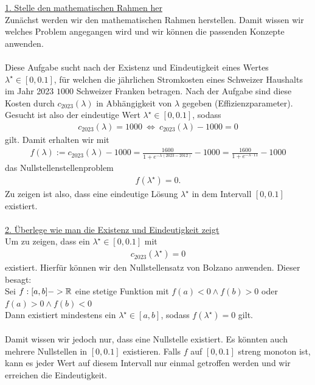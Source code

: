 \underline{1. Stelle den mathematischen Rahmen her}\\
Zunächst werden wir den mathematischen Rahmen herstellen. Damit wissen wir welches Problem angegangen wird und wir können die passenden Konzepte anwenden.\\
\\
Diese Aufgabe sucht nach der Existenz und Eindeutigkeit eines Wertes $\lambda^\star \in [0,0.1]$, für welchen die jährlichen Stromkosten eines Schweizer Haushalts im Jahr 2023 $1000$ Schweizer Franken betragen.
Nach der Aufgabe sind diese Kosten durch $c_{2023}(\lambda)$ in Abhängigkeit von $\lambda$ gegeben (Effizienzparameter).
Gesucht ist also der eindeutige Wert $\lambda^\star \in [0,0.1]$, sodass 
\begin{align*}
	c_{2023}(\lambda) = 1000
	\ \Leftrightarrow \ 
	c_{2023}(\lambda) - 1000 = 0
\end{align*}
gilt. Damit erhalten wir mit 
\begin{align*}
	f(\lambda) := c_{2023}(\lambda) - 1000 
	=
	\frac{1600}{1 + e^{- \lambda (2023 - 2012)}} - 1000
	=
	\frac{1600}{1 + e^{- \lambda\cdot 11}} - 1000
\end{align*}
das Nullstellenstellenproblem
\begin{align*}
	f(\lambda^\star) = 0.
\end{align*}
Zu zeigen ist also, dass eine eindeutige Lösung $\lambda^\star$ in dem Intervall $[0, 0.1]$ existiert.\\
\\
\underline{2. Überlege wie man die Existenz und Eindeutigkeit zeigt}\\
Um zu zeigen, dass ein $\lambda^\star  \in [0,0.1]$ mit
\begin{align*}
	c_{2023}(\lambda^\star) = 0
\end{align*}
existiert. Hierfür können wir den Nullstellensatz von Bolzano anwenden. Dieser besagt:\\
Sei $f:[a,b] -> \mathbb{R}$ eine stetige Funktion mit $f(a) < 0 \wedge f(b) > 0 $ oder $f(a) > 0 \wedge f(b) < 0$\\
Dann existiert mindestens ein $\lambda^\star \in [a,b]$, sodass $f(\lambda^\star) = 0$ gilt.\\
\\
Damit wissen wir jedoch nur, dass eine Nullstelle existiert. Es könnten auch mehrere Nullstellen in $[0,0.1]$ existieren. 
Falls $f $ auf $[0,0.1]$ streng monoton ist, kann es jeder Wert auf diesem Intervall nur einmal getroffen werden und wir erreichen die Eindeutigkeit.\\
